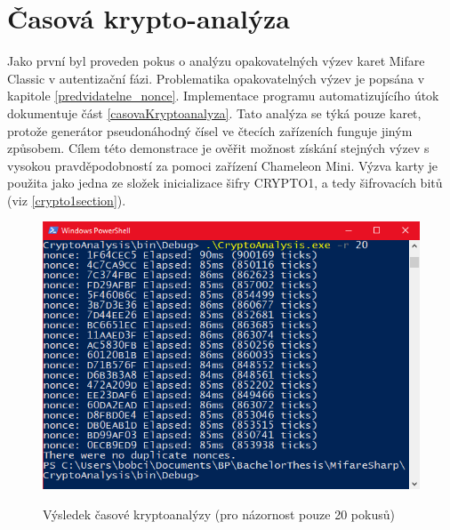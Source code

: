 \section{Časová krypto-analýza}
\label{vyhodnoceniKryptoAnalyza}
Jako první byl proveden pokus o analýzu opakovatelných výzev karet Mifare Classic v autentizační fázi. Problematika opakovatelných výzev je popsána v kapitole \ref{predvidatelne_nonce}. Implementace programu automatizujícího útok dokumentuje část \ref{casovaKryptoanalyza}. Tato analýza se týká pouze karet, protože generátor pseudonáhodný čísel ve čtecích zařízeních funguje jiným způsobem. Cílem této demonstrace je ověřit možnost získání stejných výzev s vysokou pravděpodobností za pomoci zařízení Chameleon Mini. Výzva karty je použita jako jedna ze složek inicializace šifry CRYPTO1, a tedy šifrovacích bitů (viz \ref{crypto1section}). \par

\begin{figure}[ht]\centering
  \centering
  \includegraphics[width=\linewidth]{obrazky-figures/obrazekKryptoanalyza.png}\\[1pt]  
  \caption{Výsledek časové kryptoanalýzy (pro názornost pouze 20 pokusů)}    
  \label{obrazekKryptoanalyza}
\end{figure}

